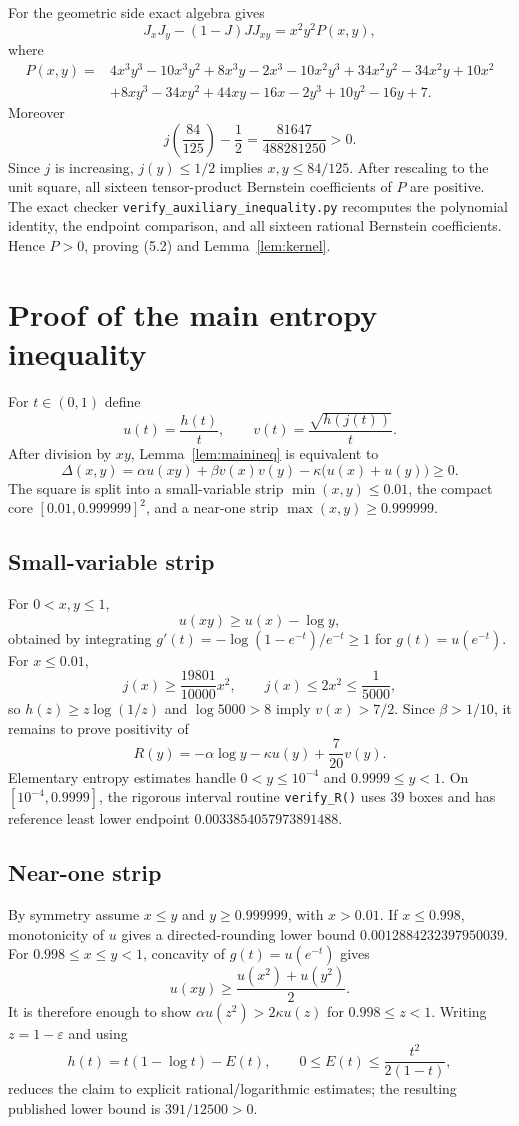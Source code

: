 \documentclass[11pt]{article}
\begin{document}
For the geometric side exact algebra gives
\[
J_xJ_y-(1-J)JJ_{xy}=x^2y^2P(x,y),
\]
where
\begin{align*}
P(x,y)={}&4x^3y^3-10x^3y^2+8x^3y-2x^3
-10x^2y^3+34x^2y^2-34x^2y+10x^2\\
&+8xy^3-34xy^2+44xy-16x-2y^3+10y^2-16y+7.
\end{align*}
Moreover
\[
j\left(\frac{84}{125}\right)-\frac12
=\frac{81647}{488281250}>0.
\]
Since $j$ is increasing, $j(y)\le1/2$ implies $x,y\le84/125$. After
rescaling to the unit square, all sixteen tensor-product Bernstein
coefficients of $P$ are positive. The exact checker
\texttt{verify\_auxiliary\_inequality.py} recomputes the polynomial identity,
the endpoint comparison, and all sixteen rational Bernstein coefficients.
Hence $P>0$, proving (5.2) and Lemma~\ref{lem:kernel}.

\section{Proof of the main entropy inequality}\label{sec:mainineq}

For $t\in(0,1)$ define
\[
u(t)=\frac{h(t)}t,\qquad
v(t)=\frac{\sqrt{h(j(t))}}t.
\]
After division by $xy$, Lemma~\ref{lem:mainineq} is equivalent to
\[
\Delta(x,y)=\alpha u(xy)+\beta v(x)v(y)
-\kappa\bigl(u(x)+u(y)\bigr)\ge0. \tag{6.1}
\]
The square is split into a small-variable strip $\min(x,y)\le0.01$, the
compact core $[0.01,0.999999]^2$, and a near-one strip
$\max(x,y)\ge0.999999$.

\subsection{Small-variable strip}
For $0<x,y\le1$,
\[
u(xy)\ge u(x)-\log y, \tag{6.2}
\]
obtained by integrating $g'(t)=-\log(1-e^{-t})/e^{-t}\ge1$ for
$g(t)=u(e^{-t})$. For $x\le0.01$,
\[
j(x)\ge\frac{19801}{10000}x^2,\qquad
j(x)\le2x^2\le\frac1{5000},
\]
so $h(z)\ge z\log(1/z)$ and $\log5000>8$ imply $v(x)>7/2$. Since
$\beta>1/10$, it remains to prove positivity of
\[
R(y)=-\alpha\log y-\kappa u(y)+\frac7{20}v(y).
\]
Elementary entropy estimates handle $0<y\le10^{-4}$ and
$0.9999\le y<1$. On $[10^{-4},0.9999]$, the rigorous interval routine
\texttt{verify\_R()} uses 39 boxes and has reference least lower endpoint
$0.0033854057973891488$.

\subsection{Near-one strip}
By symmetry assume $x\le y$ and $y\ge0.999999$, with $x>0.01$. If
$x\le0.998$, monotonicity of $u$ gives a directed-rounding lower bound
$0.0012884232397950039$. For $0.998\le x\le y<1$, concavity of
$g(t)=u(e^{-t})$ gives
\[
u(xy)\ge\frac{u(x^2)+u(y^2)}2.
\]
It is therefore enough to show $\alpha u(z^2)>2\kappa u(z)$ for
$0.998\le z<1$. Writing $z=1-\varepsilon$ and using
\[
h(t)=t(1-\log t)-E(t),\qquad
0\le E(t)\le\frac{t^2}{2(1-t)},
\]
reduces the claim to explicit rational/logarithmic estimates; the resulting
published lower bound is $391/12500>0$.
\end{document}

